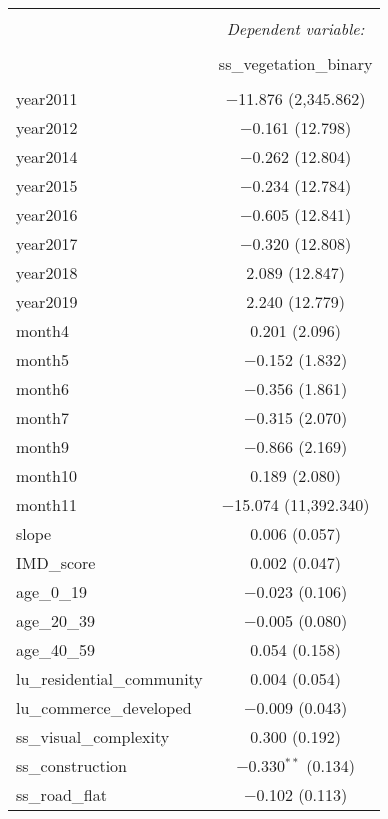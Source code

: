 
\begin{table}[!htbp] \centering 
  \caption{} 
  \label{} 
\small 
\begin{tabular}{@{\extracolsep{1pt}}lc} 
\\[-1.8ex]\hline 
\hline \\[-1.8ex] 
 & \multicolumn{1}{c}{\textit{Dependent variable:}} \\ 
\cline{2-2} 
\\[-1.8ex] & ss\_vegetation\_binary \\ 
\hline \\[-1.8ex] 
 year2011 & $-$11.876 (2,345.862) \\ 
  year2012 & $-$0.161 (12.798) \\ 
  year2014 & $-$0.262 (12.804) \\ 
  year2015 & $-$0.234 (12.784) \\ 
  year2016 & $-$0.605 (12.841) \\ 
  year2017 & $-$0.320 (12.808) \\ 
  year2018 & 2.089 (12.847) \\ 
  year2019 & 2.240 (12.779) \\ 
  month4 & 0.201 (2.096) \\ 
  month5 & $-$0.152 (1.832) \\ 
  month6 & $-$0.356 (1.861) \\ 
  month7 & $-$0.315 (2.070) \\ 
  month9 & $-$0.866 (2.169) \\ 
  month10 & 0.189 (2.080) \\ 
  month11 & $-$15.074 (11,392.340) \\ 
  slope & 0.006 (0.057) \\ 
  IMD\_score & 0.002 (0.047) \\ 
  age\_0\_19 & $-$0.023 (0.106) \\ 
  age\_20\_39 & $-$0.005 (0.080) \\ 
  age\_40\_59 & 0.054 (0.158) \\ 
  lu\_residential\_community & 0.004 (0.054) \\ 
  lu\_commerce\_developed & $-$0.009 (0.043) \\ 
  ss\_visual\_complexity & 0.300 (0.192) \\ 
  ss\_construction & $-$0.330$^{**}$ (0.134) \\ 
  ss\_road\_flat & $-$0.102 (0.113) \\ 

\end{tabular}
\end{table}
